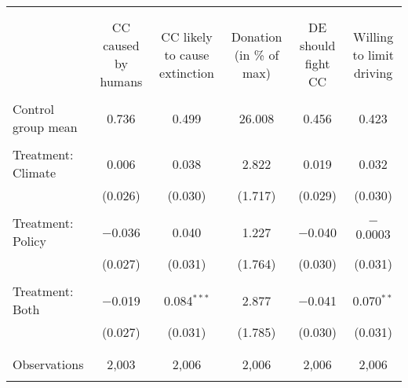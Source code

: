 
\begin{tabular}{@{\extracolsep{5pt}}lccccc} 
\\[-1.8ex]\hline 
\hline \\[-1.8ex] 
\\[-1.8ex] & CC caused by humans & CC likely to cause extinction & Donation (in \% of max) & DE should fight CC & Willing to limit driving \\ 
\hline \\[-1.8ex] 
 Control group mean & 0.736 & 0.499 & 26.008 & 0.456 & 0.423  \\ \hline \\[-1.8ex] Treatment: Climate & 0.006 & 0.038 & 2.822 & 0.019 & 0.032 \\ 
  & (0.026) & (0.030) & (1.717) & (0.029) & (0.030) \\ 
  & & & & & \\ 
 Treatment: Policy & $-$0.036 & 0.040 & 1.227 & $-$0.040 & $-$0.0003 \\ 
  & (0.027) & (0.031) & (1.764) & (0.030) & (0.031) \\ 
  & & & & & \\ 
 Treatment: Both & $-$0.019 & 0.084$^{***}$ & 2.877 & $-$0.041 & 0.070$^{**}$ \\ 
  & (0.027) & (0.031) & (1.785) & (0.030) & (0.031) \\ 
  & & & & & \\ 
\hline \\[-1.8ex] 

Observations & 2,003 & 2,006 & 2,006 & 2,006 & 2,006 \\ 
\hline 
\hline \\[-1.8ex] 
\end{tabular} 